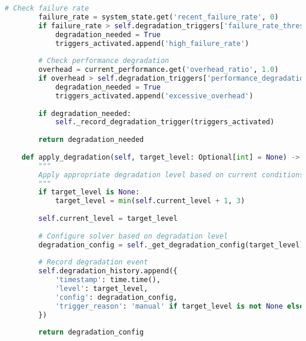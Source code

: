 \begin{lstlisting}[language=Python, caption=Graceful Degradation for Worst-Case Scenarios]
        # Check failure rate
        failure_rate = system_state.get('recent_failure_rate', 0)
        if failure_rate > self.degradation_triggers['failure_rate_threshold']:
            degradation_needed = True
            triggers_activated.append('high_failure_rate')
        
        # Check performance degradation
        overhead = current_performance.get('overhead_ratio', 1.0)
        if overhead > self.degradation_triggers['performance_degradation_threshold']:
            degradation_needed = True
            triggers_activated.append('excessive_overhead')
        
        if degradation_needed:
            self._record_degradation_trigger(triggers_activated)
        
        return degradation_needed
    
    def apply_degradation(self, target_level: Optional[int] = None) -> Dict[str, Any]:
        """
        Apply appropriate degradation level based on current conditions.
        """
        if target_level is None:
            target_level = min(self.current_level + 1, 3)
        
        self.current_level = target_level
        
        # Configure solver based on degradation level
        degradation_config = self._get_degradation_config(target_level)
        
        # Record degradation event
        self.degradation_history.append({
            'timestamp': time.time(),
            'level': target_level,
            'config': degradation_config,
            'trigger_reason': 'manual' if target_level is not None else 'automatic'
        })
        
        return degradation_config
    

\end{lstlisting}
